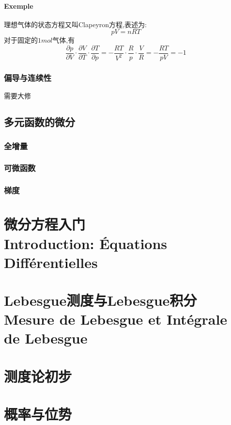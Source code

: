 \documentclass[12pt, a4paper, oneside]{ctexbook}
\begin{document}
  \subsubsection{Exemple}
  理想气体的状态方程又叫Clapeyron方程,表述为:
  $$
  pV=nRT
  $$
  对于固定的$1mol$气体,有
  $$
  \frac{\partial p}{\partial V}\cdot\frac{\partial V}{\partial T}\cdot\frac{\partial T}{\partial p}=-\frac{RT}{V^2}\cdot\frac{R}{p}\cdot\frac{V}{R}=-\frac{RT}{pV}=-1
  $$
  \subsection{偏导与连续性}
  需要大修




  \section{多元函数的微分}
  \subsection{全增量}
  \subsection{可微函数}
  \subsection{梯度}
  \chapter{微分方程入门\\Introduction: Équations Différentielles}
  \chapter{Lebesgue测度与Lebesgue积分\\ Mesure de Lebesgue et Intégrale de Lebesgue}
  \chapter{测度论初步}
  \chapter{概率与位势}  
\end{document}
